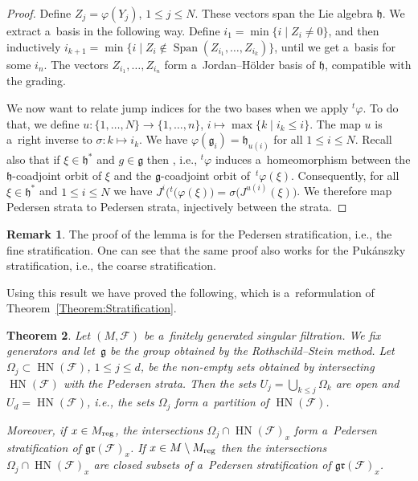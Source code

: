 \documentclass[10pt,a4paper]{article}
\newcommand{\tsp}[1]{{}^t \! #1} %
\newcommand{\Span}{\operatorname{Span}} %
\newcommand{\F}{\mathcal{F}} %
\newcommand{\Ad}{\operatorname{Ad}} %
\newcommand{\g}{\mathfrak{g}} %
\newcommand{\HN}{\operatorname{HN}} %
\newcommand{\Fb}{\mathcal{F}} %
\newcommand{\gr}{\mathfrak{gr}} %
\numberwithin{equation}{section}
\newtheorem{thm}{Theorem}[section]
\theoremstyle{definition}
\newtheorem{rem}[thm]{Remark}
\begin{document}
\begin{proof}
 Define $Z_j = \varphi(Y_j)$, $1\leq j \leq N$. These vectors span the Lie algebra $\mathfrak{h}$. We extract a~basis in the following way. Define $i_1 = \min\{i\mid Z_i \neq 0\}$,
 and then inductively $i_{k+1} = \min\{i \mid Z_i \notin \Span(Z_{i_1},\dots, Z_{i_k})\}$,
 until we get a~basis for some $i_n$.
 The vectors $Z_{i_1}, \dots, Z_{i_n}$ form a~Jordan--H\"older basis of $\mathfrak{h}$, compatible with the grading.

 We now want to relate jump indices for the two bases when we apply $\tsp\varphi$. To do that, we define
$u \colon  \{1,\dots,N\}  \to \{1,\dots,n\}$, $ i \mapsto \max\{k\mid i_k \leq i\}$.
 The map $u$ is a~right inverse to $\sigma \colon k \mapsto i_k$. We have $\varphi(\g_i) = \mathfrak{h}_{u(i)}$ for all $1\leq i \leq N$. Recall also that if $\xi \in \mathfrak{h}^*$ and $g \in \g$ then \smash{$\tsp\varphi\bigl(\Ad^*_{\varphi(g)}(\xi)\bigr) = \Ad^*_g\bigl(\tsp\varphi(\xi)\bigr)$},
 i.e., $\tsp\varphi$ induces a~homeomorphism between the $\mathfrak{h}$-coadjoint orbit of $\xi$ and the $\g$-coadjoint orbit of~$\tsp\varphi(\xi)$.
 Consequently, for all $\xi \in \mathfrak{h}^*$ and $1\leq i \leq N$ we have $J^i\bigl(\tsp(\varphi(\xi)\bigr) = \sigma\bigl(J^{u(i)}(\xi)\bigr)$.
 We therefore map Pedersen strata to Pedersen strata, injectively between the strata.
\end{proof}

\begin{rem}
 The proof of the lemma is for the Pedersen stratification, i.e., the fine stratification. One can see that the same proof also works for the Puk\'anszky stratification, i.e., the coarse stratification.
\end{rem}

Using this result we have proved the following, which is a~reformulation of Theorem~\ref{Theorem:Stratification}.

\begin{thm}\label{Theorem:Stratification-InText}
 Let $(M,\Fb)$ be a~finitely generated singular filtration. We fix generators and let~$\g$ be the group obtained by the Rothschild--Stein method.
 Let $\Omega_j \subset \HN(\Fb)$, $1\leq j \leq d$, be the non-empty sets obtained by intersecting $\HN(\Fb)$ with the Pedersen strata. Then the sets $U_j=\bigcup_{k\leq j}\Omega_k$ are open and $U_d = \HN(\Fb)$, i.e., the sets $\Omega_j$ form a~partition of $\HN(\Fb)$.

 Moreover, if $x \in M_{\rm reg}$, the intersections $\Omega_j\cap \HN(\F)_x$ form a~Pedersen stratification of $\gr(\Fb)_x$. If $x\in M\setminus M_{\rm reg}$ then the intersections $\Omega_j\cap \HN(\F)_x$ are closed subsets of a~Pedersen stratification of $\gr(\Fb)_x$.
\end{thm}
\end{document}
